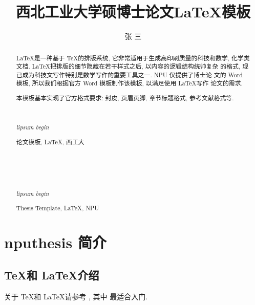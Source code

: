 \documentclass[twoside, workbib, UTF8, phd]{nputhesis}
\title[\LaTeX\ Template for Thesis of NPU]{西北工业大学硕博士论文\LaTeX 模板}
\author[San Zhang]{张\,\,三}
\theoremstyle{plain}
\begin{document}
\makecover    %
\frontmatter  %

\begin{abstract}
  \LaTeX 是一种基于 \TeX 的排版系统, 它非常适用于生成高印刷质量的科技和数学,
  化学类文档. \LaTeX 把排版的细节隐藏在若干样式之后, 以内容的逻辑结构统帅复杂
  的格式, 现已成为科技文写作特别是数学写作的重要工具之一. NPU 仅提供了博士论
  文的 Word 模板, 所以我们根据官方 Word 模板制作该模板, 以满足使用 \LaTeX 写作
  论文的需求.

  本模板基本实现了官方格式要求: 封皮, 页眉页脚, 章节标题格式, 参考文献格式等.

  { %
    \noindent\hrulefill\\
    {\centerline {\it lipsum begin}}
    \noindent\hrulefill
  }
  \begin{keywords}
    论文模板, \LaTeX, 西工大
  \end{keywords}
\end{abstract}

\begin{Abstract}
  { %
    \noindent\hrulefill\\
    {\centerline {\it lipsum begin}}
    \noindent\hrulefill
  }
  \begin{Keywords}
    Thesis Template, \LaTeX, NPU
  \end{Keywords}
\end{Abstract}

\tableofcontents    %
\printnomenclature  %
\mainmatter         %


\chapter{nputhesis 简介}

\section{\TeX 和 \LaTeX 介绍}
关于 \TeX 和 \LaTeX 请参考 \cite{Knuth1986,Lamport1994,Liu2013}, 其中 \cite{Liu2013} 最适合入门.
\end{document}
